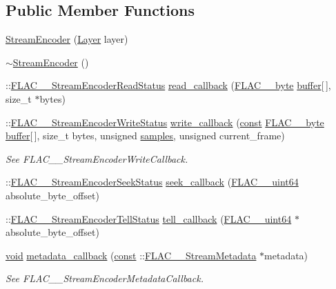 \subsection*{Public Member Functions}
\begin{DoxyCompactItemize}
\item 
\hyperlink{class_stream_encoder_a8d58d165dbf131cba271ae5f5f53b1c7}{Stream\+Encoder} (\hyperlink{decoders_8c_a9a8118be7780e95363d631cbca7e7800}{Layer} layer)
\item 
\hyperlink{class_stream_encoder_a096fc854bf1d9cc28f47fd7a114a4ac2}{$\sim$\+Stream\+Encoder} ()
\item 
\+::\hyperlink{group__flac__stream__encoder_ga2e81f007fb0a7414c0bbb453f37ea37f}{F\+L\+A\+C\+\_\+\+\_\+\+Stream\+Encoder\+Read\+Status} \hyperlink{class_stream_encoder_a35d2f2284e85c20bcc0e407096f3b0c7}{read\+\_\+callback} (\hyperlink{ordinals_8h_a5eb569b12d5b047cdacada4d57924ee3}{F\+L\+A\+C\+\_\+\+\_\+byte} \hyperlink{structbuffer}{buffer}\mbox{[}$\,$\mbox{]}, size\+\_\+t $\ast$bytes)
\item 
\+::\hyperlink{group__flac__stream__encoder_ga3737471fd49730bb8cf9b182bdeda05e}{F\+L\+A\+C\+\_\+\+\_\+\+Stream\+Encoder\+Write\+Status} \hyperlink{class_stream_encoder_a15af9ee2b5a1576ba3be31f9490c2fc4}{write\+\_\+callback} (\hyperlink{getopt1_8c_a2c212835823e3c54a8ab6d95c652660e}{const} \hyperlink{ordinals_8h_a5eb569b12d5b047cdacada4d57924ee3}{F\+L\+A\+C\+\_\+\+\_\+byte} \hyperlink{structbuffer}{buffer}\mbox{[}$\,$\mbox{]}, size\+\_\+t bytes, unsigned \hyperlink{test__w__saw8_8c_a54185623a5a093f671a73e5fba6197a1}{samples}, unsigned current\+\_\+frame)
\begin{DoxyCompactList}\small\item\em See F\+L\+A\+C\+\_\+\+\_\+\+Stream\+Encoder\+Write\+Callback. \end{DoxyCompactList}\item 
\+::\hyperlink{group__flac__stream__encoder_ga6d5be3489f45fcf0c252022c65d87aca}{F\+L\+A\+C\+\_\+\+\_\+\+Stream\+Encoder\+Seek\+Status} \hyperlink{class_stream_encoder_a791b2e8158ede7b3a3e99aded8f3f4d8}{seek\+\_\+callback} (\hyperlink{ordinals_8h_aa78c8c70a3eb8a58af7436f278acde8e}{F\+L\+A\+C\+\_\+\+\_\+uint64} absolute\+\_\+byte\+\_\+offset)
\item 
\+::\hyperlink{group__flac__stream__encoder_gab628f63181250eb977a28bf12b7dd9ff}{F\+L\+A\+C\+\_\+\+\_\+\+Stream\+Encoder\+Tell\+Status} \hyperlink{class_stream_encoder_a42d625814caa51193e29630d5c57da94}{tell\+\_\+callback} (\hyperlink{ordinals_8h_aa78c8c70a3eb8a58af7436f278acde8e}{F\+L\+A\+C\+\_\+\+\_\+uint64} $\ast$absolute\+\_\+byte\+\_\+offset)
\item 
\hyperlink{sound_8c_ae35f5844602719cf66324f4de2a658b3}{void} \hyperlink{class_stream_encoder_ad73a7935bd048a11668dd2c70566d41d}{metadata\+\_\+callback} (\hyperlink{getopt1_8c_a2c212835823e3c54a8ab6d95c652660e}{const} \+::\hyperlink{struct_f_l_a_c_____stream_metadata}{F\+L\+A\+C\+\_\+\+\_\+\+Stream\+Metadata} $\ast$metadata)
\begin{DoxyCompactList}\small\item\em See F\+L\+A\+C\+\_\+\+\_\+\+Stream\+Encoder\+Metadata\+Callback. \end{DoxyCompactList}\end{DoxyCompactItemize}
